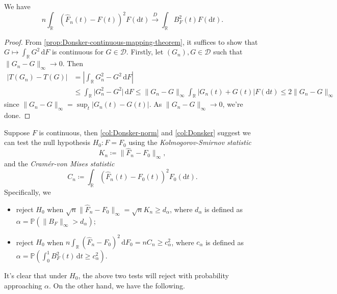 \begin{corollary}\label{col:Donsker}
	We have
	\[
		n \int _\mathbb{R} \left( \hat{F} _n(t) - F(t) \right) ^2 F(\mathrm{d} t)
		\overset{D}{\to} \int _\mathbb{R} B_F^2(t) F(\mathrm{d} t).
	\]
\end{corollary}
\begin{proof}
	From \autoref{prop:Donsker-continuous-mapping-theorem}, it suffices to show that \(G \mapsto \int _\mathbb{R} G^2 \,\mathrm{d} F\) is continuous for \(G \in \mathcal{D} \). Firstly, let \((G_n), G \in \mathcal{D} \) such that \(\lVert G_n - G \rVert _\infty \to 0\). Then
	\[
		\begin{split}
			\vert T(G_n) - T(G) \vert
			 & = \left\vert \int _\mathbb{R} G^2_n - G^2 \,\mathrm{d} F \right\vert \\
			 & \leq \int _\mathbb{R} \vert G_n^2 - G^2 \vert \,\mathrm{d} F
			\leq \lVert G_n - G \rVert _\infty \int _\mathbb{R} \vert G_n(t) + G(t) \vert F(\mathrm{d} t)
			\leq 2 \lVert G_n - G \rVert _\infty
		\end{split}
	\]
	since \(\lVert G_n - G \rVert _\infty = \sup _t \vert G_n(t) - G(t) \vert \). As \(\lVert G_n - G \rVert _\infty \to 0\), we're done.
\end{proof}

Suppose \(F\) is continuous, then \autoref{col:Donsker-norm} and \autoref{col:Donsker} suggest we can test the null hypothesis \(H_0 \colon F = F_0\) using the \emph{Kolmogorov-Smirnov statistic}
\[
	K_n \coloneqq \lVert \hat{F} _n - F_0 \rVert _\infty ,
\]
and the \emph{Cramér-von Mises statistic}
\[
	C_n \coloneqq \int _\mathbb{R} \left( \hat{F} _n(t) - F_0(t) \right) ^2 F_0(\mathrm{d} t).
\]
Specifically, we
\begin{itemize}
	\item reject \(H_0\) when \(\sqrt{n} \lVert \hat{F} _n - F_0 \rVert _\infty = \sqrt{n} K_n \geq d_\alpha \), where \(d_\alpha \) is defined as \(\alpha = \mathbb{P} (\lVert B_F \rVert _\infty > d_\alpha )\);
	\item reject \(H_0\) when \(n \int _\mathbb{R} (\hat{F} _n - F_0)^2 \,\mathrm{d} F_0 = n C_n \geq c_{\alpha }^2\), where \(c_\alpha \) is defined as \(\alpha = \mathbb{P} (\int_{0}^{1} B_F^2(t) \,\mathrm{d}t \geq c_\alpha ^2)\).
\end{itemize}
It's clear that under \(H_0\), the above two tests will reject with probability approaching \(\alpha \). On the other hand, we have the following.

